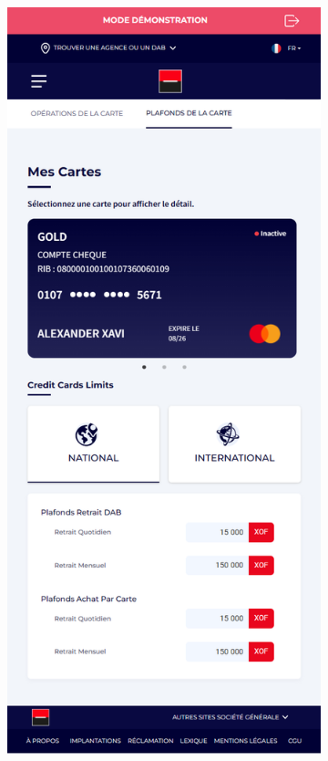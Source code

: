 \begin{figure}[!ht]
    \centering
    \begin{subfigure}[b]{0.49\textwidth}
        \centering
        \includegraphics[width=\textwidth]{images/screens/plafondsNat/mob.png}

\end{subfigure}
\end{figure}
